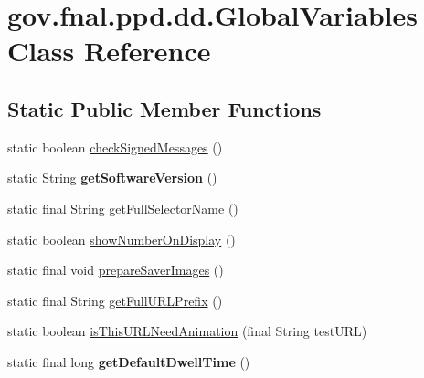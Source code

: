 \hypertarget{classgov_1_1fnal_1_1ppd_1_1dd_1_1GlobalVariables}{\section{gov.\-fnal.\-ppd.\-dd.\-Global\-Variables Class Reference}
\label{classgov_1_1fnal_1_1ppd_1_1dd_1_1GlobalVariables}
}
\subsection*{Static Public Member Functions}
\begin{DoxyCompactItemize}
\item 
static boolean \hyperlink{classgov_1_1fnal_1_1ppd_1_1dd_1_1GlobalVariables_a8476c0f09c9b451243871c5d810a637e}{check\-Signed\-Messages} ()
\item 
\hypertarget{classgov_1_1fnal_1_1ppd_1_1dd_1_1GlobalVariables_a7ad73efb183068d334b1977c3ef799cc}{static String {\bfseries get\-Software\-Version} ()}\label{classgov_1_1fnal_1_1ppd_1_1dd_1_1GlobalVariables_a7ad73efb183068d334b1977c3ef799cc}

\item 
static final String \hyperlink{classgov_1_1fnal_1_1ppd_1_1dd_1_1GlobalVariables_ae88e0336fe6e23f56d14aee1882b88d4}{get\-Full\-Selector\-Name} ()
\item 
static boolean \hyperlink{classgov_1_1fnal_1_1ppd_1_1dd_1_1GlobalVariables_a76a3e484172e77490916e0a8a7100d8b}{show\-Number\-On\-Display} ()
\item 
static final void \hyperlink{classgov_1_1fnal_1_1ppd_1_1dd_1_1GlobalVariables_ad98b765500d19827fff9a6aa78b8b9a4}{prepare\-Saver\-Images} ()
\item 
static final String \hyperlink{classgov_1_1fnal_1_1ppd_1_1dd_1_1GlobalVariables_ab7639ebfcc296b374593079a06026c65}{get\-Full\-U\-R\-L\-Prefix} ()
\item 
static boolean \hyperlink{classgov_1_1fnal_1_1ppd_1_1dd_1_1GlobalVariables_a635743039cfe736aa5a0758711c96dd1}{is\-This\-U\-R\-L\-Need\-Animation} (final String test\-U\-R\-L)
\item 
\hypertarget{classgov_1_1fnal_1_1ppd_1_1dd_1_1GlobalVariables_aedef0ba63ced272b0ec2f17504a2cf96}{static final long {\bfseries get\-Default\-Dwell\-Time} ()}\label{classgov_1_1fnal_1_1ppd_1_1dd_1_1GlobalVariables_aedef0ba63ced272b0ec2f17504a2cf96}


\end{DoxyCompactItemize}
